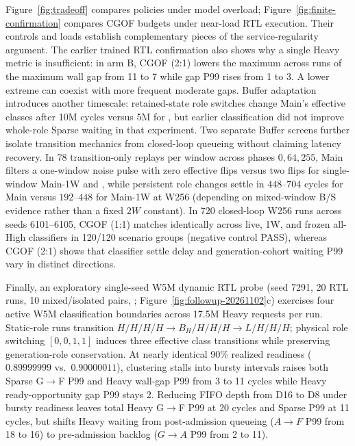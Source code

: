 Figure~\ref{fig:tradeoff} compares policies under model overload; Figure~\ref{fig:finite-confirmation} compares CGOF budgets under near-load RTL execution. Their controls and loads establish complementary pieces of the service-regularity argument. The earlier trained RTL confirmation also shows why a single Heavy metric is insufficient: in arm B, CGOF (2:1) lowers the maximum across runs of the maximum wall gap from 11 to 7 while gap P99 rises from 1 to 3. A lower extreme can coexist with more frequent moderate gaps. Buffer adaptation introduces another timescale: retained-state role switches change Main's effective classes after 10M cycles versus 5M for \Alg, but earlier classification did not improve whole-role Sparse waiting in that experiment. Two separate  Buffer screens further isolate transition mechanics from closed-loop queueing without claiming latency recovery. In 78 transition-only replays per window across phases $0,64,255$, Main filters a one-window noise pulse with zero effective flips versus two flips for single-window Main-1W and \Alg, while persistent role changes settle in $448\text{--}704$ cycles for Main versus $192\text{--}448$ for Main-1W at W256 (depending on mixed-window B/S evidence rather than a fixed $2W$ constant). In 720 closed-loop W256 runs across seeds 6101--6105, CGOF (1:1) matches identically across live, 1W, and frozen all-High classifiers in 120/120 scenario groups (negative control PASS), whereas CGOF (2:1) shows that classifier settle delay and generation-cohort waiting P99 vary in distinct directions.

Finally, an exploratory single-seed W5M dynamic RTL probe (seed 7291, 20 RTL runs, 10 mixed/isolated pairs, ; Figure~\ref{fig:followup-20261102}c) exercises four active W5M classification boundaries across 17.5M Heavy requests per run. Static-role runs transition $H/H/H/H\rightarrow B_H/H/H/H\rightarrow L/H/H/H$; physical role switching $[0,0,1,1]$ induces three effective class transitions while preserving generation-role conservation. At nearly identical 90\% realized readiness ($0.89999999$ vs.\ $0.90000011$), clustering stalls into bursty intervals raises both Sparse G$\rightarrow$F P99 and Heavy wall-gap P99 from 3 to 11 cycles while Heavy ready-opportunity gap P99 stays 2. Reducing FIFO depth from D16 to D8 under bursty readiness leaves total Heavy G$\rightarrow$F P99 at 20 cycles and Sparse P99 at 11 cycles, but shifts Heavy waiting from post-admission queueing ($A\rightarrow F$ P99 from 18 to 16) to pre-admission backlog ($G\rightarrow A$ P99 from 2 to 11).

